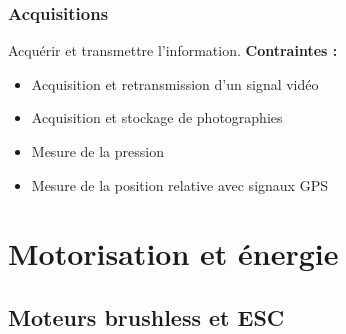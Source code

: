 \documentclass[a4paper,11pt]{report}
\begin{document}
						\subsection{Acquisitions}
								Acquérir et transmettre l'information. \newline
								\textbf{Contraintes :}
								\begin{itemize}
										\item Acquisition et retransmission d'un signal vidéo
										\item Acquisition et stockage de photographies
										\item Mesure de la pression
										\item Mesure de la position relative avec signaux GPS
								\end{itemize}
													
\chapter{Motorisation et énergie}

				\section{Moteurs brushless et ESC} 
				
\end{document}
